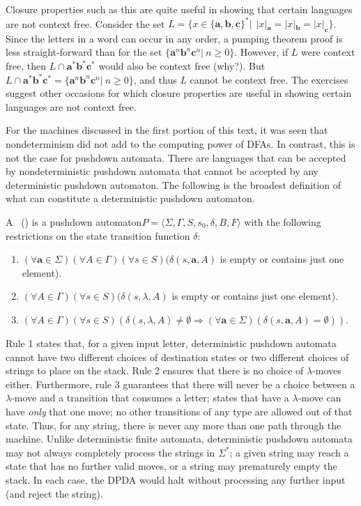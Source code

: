 Closure properties such as this are quite useful in showing that certain
languages are not context free. Consider the set $L=\{x\in\{\pmb{a},\pmb{b},
\pmb{c}\}^*|\ \ |x|_{\pmb{a}} = |x|_{\pmb{b}} = |x|_{\pmb{c}}\}$. Since the letters
in a word can occur in any order, a pumping theorem proof is less
straight-forward than for the set $\{\pmb{a}^n\pmb{b}^n\pmb{c}^n|\ n\geq 0\}$.
However, if $L$ were context free, then $L\cap\pmb{a}^*\pmb{b}^*\pmb{c}^*$ would
also be context free (why?). But $L\cap\pmb{a}^*\pmb{b}^*\pmb{c}^*=\{\pmb{a}^n\pmb{b}^n
\pmb{c}^n|\ n\geq 0\}$, and thus $L$ cannot be context free. The exercises suggest
other occasions for which closure properties are useful in showing certain
languages are not context free.

For the machines discussed in the first portion of this text, it was seen that
nondeterminism did not add to the computing power of DFAs. In contrast, this
is not the case for pushdown automata. There are languages that can be accepted
by nondeterministic pushdown automata that cannot be accepted by any
deterministic pushdown automaton. The following is the broadest definition of
what can constitute a deterministic pushdown automaton.

\begin{dfn}\label{dfn-10.8}
A\ \emph{} () is a pushdown
automaton\linebreak $P=\langle\Sigma,\Gamma,S,s_0,\delta,B,F\rangle$ with the following
restrictions on the state transition function $\delta$:
\begin{enumerate}
\item $(\forall\pmb{a}\in\Sigma)(\forall A\in\Gamma)(\forall s\in S)(\delta(s,
	\pmb{a},A)$ is empty or contains just one element).
\item $(\forall A\in\Gamma)(\forall s\in S)(\delta(s,\lambda,A)$ is empty or
	contains just one element).
\item $(\forall A\in\Gamma)(\forall s\in S)(\delta(s,\lambda,A)\not=\emptyset
	\Rightarrow (\forall\pmb{a}\in \Sigma)(\delta(s,\pmb{a},A)=\emptyset))$.
\end{enumerate}
\end{dfn}

Rule 1 states that, for a given input letter, deterministic pushdown automata
cannot have two different choices of destination states or two different choices
of strings to place on the stack. Rule 2 ensures that there is no choice of
$\lambda$-moves either. Furthermore, rule 3 guarantees that there will never be
a choice between a $\lambda$-move and a transition that consumes a letter;
states that have a $\lambda$-move can have \emph{only} that one move; no other
transitions of any type are allowed out of that state. Thus, for any string,
there is never any more than one path through the machine. Unlike deterministic
finite automata, deterministic pushdown automata may not always completely
process the strings in $\Sigma^*$; a given string may reach a state that has
no further valid moves, or a string may prematurely empty the stack. In each
case, the DPDA would halt without processing any further input (and reject the string).


